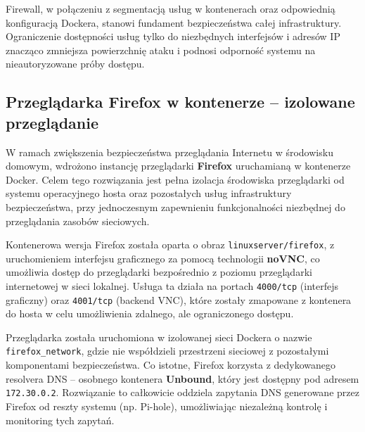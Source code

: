 \documentclass[
    left=2.5cm,         %
    right=2.5cm,        %
    top=2.5cm,          %
    bottom=3cm,         %
    bindingoffset=6mm,  %
    nohyphenation=true %
]{eiti/eiti-thesis} %
\begin{document}
Firewall, w połączeniu z segmentacją usług w kontenerach oraz odpowiednią konfiguracją Dockera, stanowi fundament bezpieczeństwa całej infrastruktury. Ograniczenie dostępności usług tylko do niezbędnych interfejsów i adresów IP znacząco zmniejsza powierzchnię ataku i podnosi odporność systemu na nieautoryzowane próby dostępu.


\subsection{Przeglądarka Firefox w kontenerze – izolowane przeglądanie}

W ramach zwiększenia bezpieczeństwa przeglądania Internetu w środowisku domowym, wdrożono instancję przeglądarki \textbf{Firefox} uruchamianą w kontenerze Docker. Celem tego rozwiązania jest pełna izolacja środowiska przeglądarki od systemu operacyjnego hosta oraz pozostałych usług infrastruktury bezpieczeństwa, przy jednoczesnym zapewnieniu funkcjonalności niezbędnej do przeglądania zasobów sieciowych.

Kontenerowa wersja Firefox została oparta o obraz \texttt{linuxserver/firefox}, z uruchomieniem interfejsu graficznego za pomocą technologii \textbf{noVNC}, co umożliwia dostęp do przeglądarki bezpośrednio z poziomu przeglądarki internetowej w sieci lokalnej. Usługa ta działa na portach \texttt{4000/tcp} (interfejs graficzny) oraz \texttt{4001/tcp} (backend VNC), które zostały zmapowane z kontenera do hosta w celu umożliwienia zdalnego, ale ograniczonego dostępu.

Przeglądarka została uruchomiona w izolowanej sieci Dockera o nazwie \texttt{firefox\_network}, gdzie nie współdzieli przestrzeni sieciowej z pozostałymi komponentami bezpieczeństwa. Co istotne, Firefox korzysta z dedykowanego resolvera DNS – osobnego kontenera \textbf{Unbound}\cite{config-unbound-firefox}, który jest dostępny pod adresem \texttt{172.30.0.2}. Rozwiązanie to całkowicie oddziela zapytania DNS generowane przez Firefox od reszty systemu (np. Pi-hole), umożliwiając niezależną kontrolę i monitoring tych zapytań.
\end{document}

